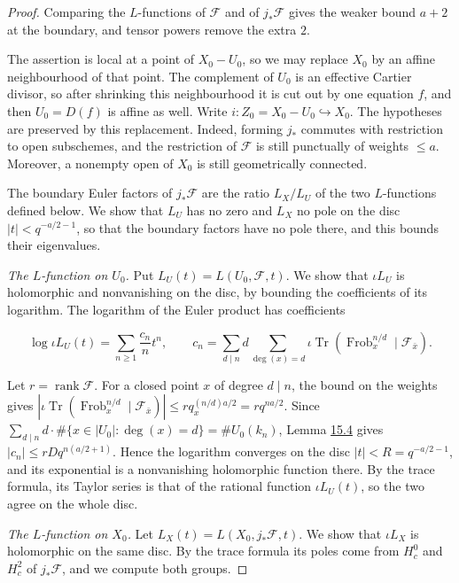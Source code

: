 \documentclass[11pt]{article}
\begin{document}
\begin{proof}[{Proof}]\label{bp14}%
Comparing the \(L\)-functions of \(\mathcal F\) and of \(j_*\mathcal F\) gives the weaker bound \(a+2\) at the boundary, and tensor powers remove the extra \(2\).

The assertion is local at a point of \(X_0-U_0\), so we may replace \(X_0\) by an affine neighbourhood of that point. The complement of \(U_0\) is an effective Cartier divisor, so after shrinking this neighbourhood it is cut out by one equation \(f\), and then \(U_0=D(f)\) is affine as well. Write \(i:Z_0=X_0-U_0\hookrightarrow X_0\). The hypotheses are preserved by this replacement. Indeed, forming \(j_*\) commutes with restriction to open subschemes, and the restriction of \(\mathcal F\) is still punctually of weights \(\le a\). Moreover, a nonempty open of \(X_0\) is still geometrically connected.

The boundary Euler factors of \(j_*\mathcal F\) are the ratio \(L_X/L_U\) of the two \(L\)-functions defined below. We show that \(L_U\) has no zero and \(L_X\) no pole on the disc \(|t|<q^{-a/2-1}\), so that the boundary factors have no pole there, and this bounds their eigenvalues.

\emph{The \(L\)-function on \(U_0\).} Put \(L_U(t)=L(U_0,\mathcal F,t)\). We show that \(\iota L_U\) is holomorphic and nonvanishing on the disc, by bounding the coefficients of its logarithm. The logarithm of the Euler product has coefficients

\[
\log\iota L_U(t)=\sum_{n\ge1}\frac{c_n}{n}t^n,
\qquad
c_n=\sum_{d\mid n}d\sum_{\deg(x)=d}
\iota\operatorname{Tr}(\operatorname{Frob}_x^{n/d}\mid\mathcal F_{\bar x}).
\]

Let \(r=\operatorname{rank}\mathcal F\). For a closed point \(x\) of degree \(d\mid n\), the bound on the weights gives \(|\iota\operatorname{Tr}(\operatorname{Frob}_x^{n/d}\mid\mathcal F_{\bar x})|
\le rq_x^{(n/d)a/2}=rq^{na/2}\). Since \(\sum_{d\mid n}d\cdot\#\{x\in|U_0|:\deg(x)=d\}=\#U_0(k_n)\), Lemma \hyperref[bp10]{15.4} gives \(|c_n|\le rDq^{n(a/2+1)}\). Hence the logarithm converges on the disc \(|t|<R=q^{-a/2-1}\), and its exponential is a nonvanishing holomorphic function there. By the trace formula, its Taylor series is that of the rational function \(\iota L_U(t)\), so the two agree on the whole disc.

\emph{The \(L\)-function on \(X_0\).} Let \(L_X(t)=L(X_0,j_*\mathcal F,t)\). We show that \(\iota L_X\) is holomorphic on the same disc. By the trace formula its poles come from \(H^0_c\) and \(H^2_c\) of \(j_*\mathcal F\), and we compute both groups.


\end{proof}
\end{document}
